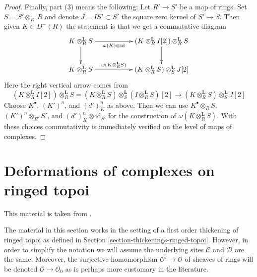 \documentclass{stacks-project}
\theoremstyle{plain}
\theoremstyle{definition}
\theoremstyle{remark}
\numberwithin{equation}{subsection}
\begin{document}
\begin{proof}
\medskip\noindent
Finally, part (3) means the following: Let $R' \to S'$ be a map of
rings. Set $S = S' \otimes_{R'} R$ and denote $J = IS' \subset S'$
the square zero kernel of $S' \to S$. Then given $K \in D^-(R)$
the statement is that we get a commutative diagram
$$
\xymatrix{
K \otimes_R^\mathbf{L} S \ar[d] \ar[rr]_-{\omega(K) \otimes \text{id}} & &
(K \otimes^\mathbf{L}_R I[2]) \otimes_R^\mathbf{L} S \ar[d] \\
K \otimes_R^\mathbf{L} S \ar[rr]^-{\omega(K \otimes_R^\mathbf{L} S)} & &
(K \otimes_R^\mathbf{L} S) \otimes^\mathbf{L}_S J[2]
}
$$
Here the right vertical arrow comes from
$$
(K \otimes^\mathbf{L}_R I[2]) \otimes_R^\mathbf{L} S =
(K \otimes_R^\mathbf{L} S) \otimes_S^\mathbf{L}
(I \otimes_R^\mathbf{L} S)[2] \longrightarrow
(K \otimes_R^\mathbf{L} S) \otimes_S^\mathbf{L} J[2]
$$
Choose $K^\bullet$, $(K')^n$, and $(d')^n_K$ as above.
Then we can use $K^\bullet \otimes_R S$, $(K')^n \otimes_{R'} S'$, and
$(d')^n_K \otimes \text{id}_{S'}$ for the construction of
$\omega(K \otimes_R^\mathbf{L} S)$.
With these choices commutativity
is immediately verified on the level of maps of complexes.
\end{proof}







\section{Deformations of complexes on ringed topoi}
\label{section-thickenings-complexes}

\noindent
This material is taken from \cite{lieblich-complexes}.

\medskip\noindent
The material in this section works in the setting of a first order thickening
of ringed topoi as defined in Section \ref{section-thickenings-ringed-topoi}.
However, in order to simplify the notation we will assume the underlying
sites $\mathcal{C}$ and $\mathcal{D}$ are the same.
Moreover, the surjective homomorphism $\mathcal{O}' \to \mathcal{O}$
of sheaves of rings will be denoted $\mathcal{O} \to \mathcal{O}_0$
as is perhaps more customary in the literature.
\end{document}
